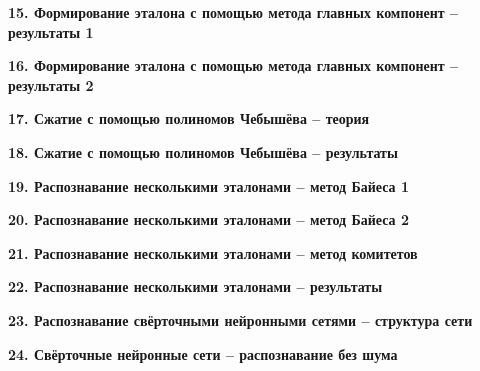 \documentclass[a4paper, 12pt]{article}
\begin{document}
\begin{center}
	\textbf{\large 15. Формирование эталона с помощью метода главных компонент – результаты 1}
\end{center}	



\begin{center}
	\textbf{\large 16. Формирование эталона с помощью метода главных компонент – результаты 2}
\end{center}	



\begin{center}
	\textbf{\large 17. Сжатие с помощью полиномов Чебышёва – теория}
\end{center}	



\begin{center}
	\textbf{\large 18. Сжатие с помощью полиномов Чебышёва – результаты}
\end{center}	



\begin{center}
	\textbf{\large 19. Распознавание несколькими эталонами – метод Байеса 1}
\end{center}	



\begin{center}
	\textbf{\large 20. Распознавание несколькими эталонами – метод Байеса 2}
\end{center}	



\begin{center}
	\textbf{\large 21. Распознавание несколькими эталонами – метод комитетов}
\end{center}	



\begin{center}
	\textbf{\large 22. Распознавание несколькими эталонами – результаты}
\end{center}	



\begin{center}
	\textbf{\large 23. Распознавание свёрточными нейронными сетями – структура сети}
\end{center}	



\begin{center}
	\textbf{\large 24. Свёрточные нейронные сети – распознавание без шума}
\end{center}	
\end{document}
